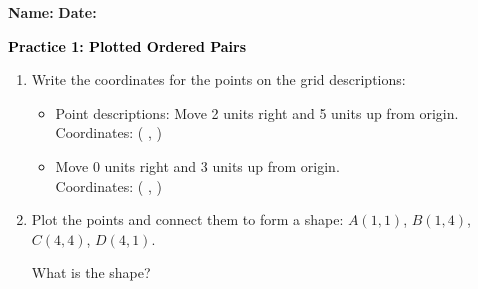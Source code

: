 \documentclass[12pt, letterpaper, fleqn]{article}
\newcommand{\blank}{\underline{\hspace{2.2cm}}}
\newcommand{\blanklong}{\underline{\hspace{6.5cm}}}
\begin{document}
\textbf{Name:} \underline{\hspace{5cm}}
\hfill
\textbf{Date:} \underline{\hspace{3cm}}\\

\begin{tcolorbox}[colback=customteal!20]
    \large\textcolor{black}{\textbf{Practice 1: Plotted Ordered Pairs}}
\end{tcolorbox}

\vspace{5mm}
\begin{enumerate}[itemsep=3cm, leftmargin=0.6cm]
\item Write the coordinates for the points on the grid descriptions:
  \begin{itemize}[itemsep=1cm]
    \item Point descriptions: Move 2 units right and 5 units up from origin. \\ Coordinates: ( \blank, \blank )
    \item Move 0 units right and 3 units up from origin. \\ Coordinates: ( \blank, \blank )
  \end{itemize}

\item Plot the points and connect them to form a shape: $A(1,1)$, $B(1,4)$, $C(4,4)$, $D(4,1)$.
\begin{center}
\end{center}
What is the shape? \blanklong
\end{enumerate}
\end{document}
